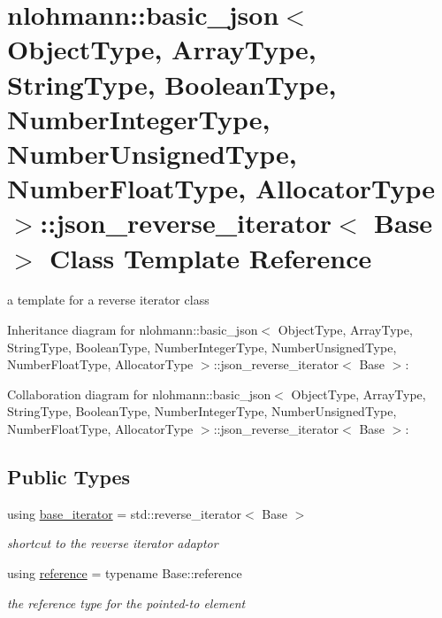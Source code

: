 \hypertarget{classnlohmann_1_1basic__json_1_1json__reverse__iterator}{}\section{nlohmann\+:\+:basic\+\_\+json$<$ Object\+Type, Array\+Type, String\+Type, Boolean\+Type, Number\+Integer\+Type, Number\+Unsigned\+Type, Number\+Float\+Type, Allocator\+Type $>$\+:\+:json\+\_\+reverse\+\_\+iterator$<$ Base $>$ Class Template Reference}
\label{classnlohmann_1_1basic__json_1_1json__reverse__iterator}


a template for a reverse iterator class  




Inheritance diagram for nlohmann\+:\+:basic\+\_\+json$<$ Object\+Type, Array\+Type, String\+Type, Boolean\+Type, Number\+Integer\+Type, Number\+Unsigned\+Type, Number\+Float\+Type, Allocator\+Type $>$\+:\+:json\+\_\+reverse\+\_\+iterator$<$ Base $>$\+:


Collaboration diagram for nlohmann\+:\+:basic\+\_\+json$<$ Object\+Type, Array\+Type, String\+Type, Boolean\+Type, Number\+Integer\+Type, Number\+Unsigned\+Type, Number\+Float\+Type, Allocator\+Type $>$\+:\+:json\+\_\+reverse\+\_\+iterator$<$ Base $>$\+:
\subsection*{Public Types}
\begin{DoxyCompactItemize}
\item 
using \hyperlink{classnlohmann_1_1basic__json_1_1json__reverse__iterator_a9ebc4c99e6fc90c965af0f39ad2ca70e}{base\+\_\+iterator} = std\+::reverse\+\_\+iterator$<$ Base $>$
\begin{DoxyCompactList}\small\item\em shortcut to the reverse iterator adaptor \end{DoxyCompactList}\item 
using \hyperlink{classnlohmann_1_1basic__json_1_1json__reverse__iterator_a7265535f39299824f9712a2ca15013c3}{reference} = typename Base\+::reference
\begin{DoxyCompactList}\small\item\em the reference type for the pointed-\/to element \end{DoxyCompactList}\end{DoxyCompactItemize}
